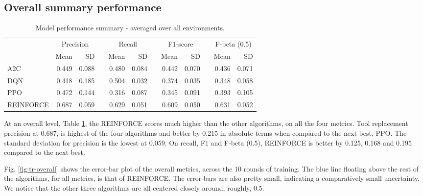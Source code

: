 \documentclass[a4paper, 12pt]{article}
\newcommand{\rowspace}[1]{\renewcommand{\arraystretch}{#1}}
\begin{document}
\subsection{Overall summary performance}
\begin{table}[!htb]\centering
	\sffamily
	\rowspace{1.3}
	\begin{tabular}{@{}l rr c rr c rr c rr@{}}
		\arrayrulecolor{black!40}\toprule
		& \multicolumn{2}{c}{Precision} & \phantom{i} & \multicolumn{2}{c}{Recall} & \phantom{i} & \multicolumn{2}{c}{F1-score} & \phantom{i} & \multicolumn{2}{c}{F-beta (0.5)} \\
		\cmidrule{2-3} \cmidrule{5-6} \cmidrule{8-9} \cmidrule{11-12} 
		
		&Mean &SD & &Mean &SD & &Mean &SD& &Mean & SD\\ \midrule
		
		A2C & 0.449 & 0.088 & &0.480 & 0.084 & & 0.442 & 0.070 & &0.436 &0.071 \\
		DQN & 0.418 & 0.185 & &0.504 & 0.032 & & 0.374 & 0.035 & &0.348 &0.058 \\
		PPO & 0.472 & 0.144 & &0.316 & 0.087 & & 0.345 & 0.091 & &0.393 &0.105 \\
		REINFORCE & 0.687 & 0.059 & &0.629 & 0.051 & & 0.609 & 0.050 & &0.631 &0.052 \\
		
		\bottomrule
	\end{tabular}
	\caption{Model performance summary - averaged over all environments.}
	\label{tbl:OverallSummary}
\end{table}
At an overall level, Table \ref{tbl:OverallSummary}, the REINFORCE scores much higher than the other algorithms, on all the four metrics. Tool replacement precision at 0.687, is highest of the four algorithms and better by 0.215 in absolute terms when compared to the next best, PPO. The standard deviation for precision is the lowest at 0.059. On recall, F1 and F-beta (0.5), REINFORCE is better by 0.125, 0.168 and 0.195 compared to the next best. 

Fig. \ref{fig:tr-overall} shows the error-bar plot of the overall metrics, across the 10 rounds of training. The blue line floating above the rest of the algorithms, for all metrics, is that of REINFORCE. The error-bars are also pretty small, indicating a comparatively small uncertainty. We notice that the other three algorithms are all centered closely around, roughly, 0.5.
\end{document}
